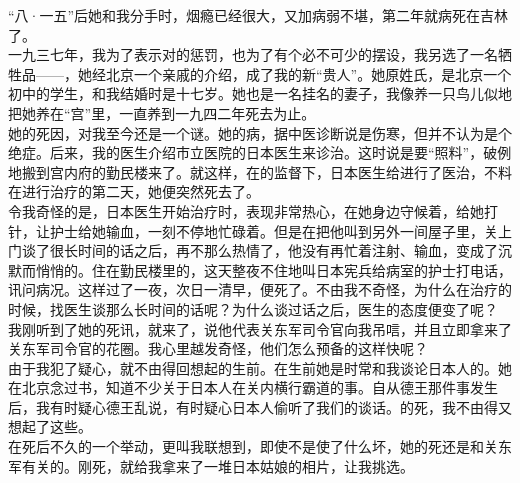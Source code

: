 “八·一五”后她和我分手时，烟瘾已经很大，又加病弱不堪，第二年就病死在吉林了。\\

一九三七年，我为了表示对的惩罚，也为了有个必不可少的摆设，我另选了一名牺牲品——，她经北京一个亲戚的介绍，成了我的新“贵人”。她原姓氏，是北京一个初中的学生，和我结婚时是十七岁。她也是一名挂名的妻子，我像养一只鸟儿似地把她养在“宫”里，一直养到一九四二年死去为止。\\

她的死因，对我至今还是一个谜。她的病，据中医诊断说是伤寒，但并不认为是个绝症。后来，我的医生介绍市立医院的日本医生来诊治。这时说是要“照料”，破例地搬到宫内府的勤民楼来了。就这样，在的监督下，日本医生给进行了医治，不料在进行治疗的第二天，她便突然死去了。\\

令我奇怪的是，日本医生开始治疗时，表现非常热心，在她身边守候着，给她打针，让护士给她输血，一刻不停地忙碌着。但是在把他叫到另外一间屋子里，关上门谈了很长时间的话之后，再不那么热情了，他没有再忙着注射、输血，变成了沉默而悄悄的。住在勤民楼里的，这天整夜不住地叫日本宪兵给病室的护士打电话，讯问病况。这样过了一夜，次日一清早，便死了。不由我不奇怪，为什么在治疗的时候，找医生谈那么长时间的话呢？为什么谈过话之后，医生的态度便变了呢？\\

我刚听到了她的死讯，就来了，说他代表关东军司令官向我吊唁，并且立即拿来了关东军司令官的花圈。我心里越发奇怪，他们怎么预备的这样快呢？\\

由于我犯了疑心，就不由得回想起的生前。在生前她是时常和我谈论日本人的。她在北京念过书，知道不少关于日本人在关内横行霸道的事。自从德王那件事发生后，我有时疑心德王乱说，有时疑心日本人偷听了我们的谈话。的死，我不由得又想起了这些。\\

在死后不久的一个举动，更叫我联想到，即使不是使了什么坏，她的死还是和关东军有关的。刚死，就给我拿来了一堆日本姑娘的相片，让我挑选。\\

